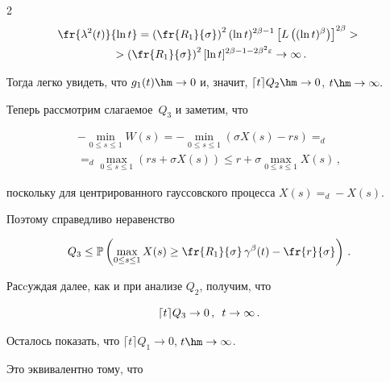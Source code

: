 \begin{multicols}{2}
\begin{multline*}


\fr{\lambda^2(t)}{\ln t}=\left( \fr{R_1}{\sigma} \right)^2(\ln t)^{2\beta-1}


\left[L\left((\ln t)^\beta\right)\right] ^{2\beta}>{}\\


{}> \left( \fr{R_1}{\sigma} \right)^2 [\ln t]^{2\beta-1-2\beta^2


\varepsilon}\to \infty\,.


\end{multline*}


Тогда легко увидеть, что  $g_1(t) \hm\to  0$ и, значит, $ \lceil t


\rceil Q_2 \hm\to 0$, $t \hm\to \infty.$





 Теперь рассмотрим слагаемое~$Q_3$ и заметим, что


\begin{multline*}


-\min\limits_{0 \leq s \leq 1} W(s)=-\min\limits_{0 \leq s \leq 1} (\sigma


X(s)-rs)=_d{}\\


{}=_d\max\limits_{0 \leq s \leq 1} (rs+\sigma X(s))\leq


r+\sigma \max\limits_{0 \leq s \leq 1} X(s)\,,


\end{multline*}


поскольку для  центрированного гауссовского процесса $X(s)=_d -X(s)$.


Поэтому справедливо неравенство


$$


Q_3 \leq \mathbb{P} \left(\max\limits_{0 \leq s \leq 1}X(s) \geq


\fr{R_1}{\sigma}\, \gamma^\beta(t) - \fr{r}{\sigma}\right)\,.


$$


Расcуждая далее, как и при анализе $Q_2$, получим, что


$$


\lceil t \rceil Q_3 \to 0\,,\enskip t \to \infty\,.


$$





Осталось показать, что $\lceil t \rceil Q_1 \to 0$, $t \hm\to \infty$. 


Это эквивалентно тому, что



\end{multicols}
